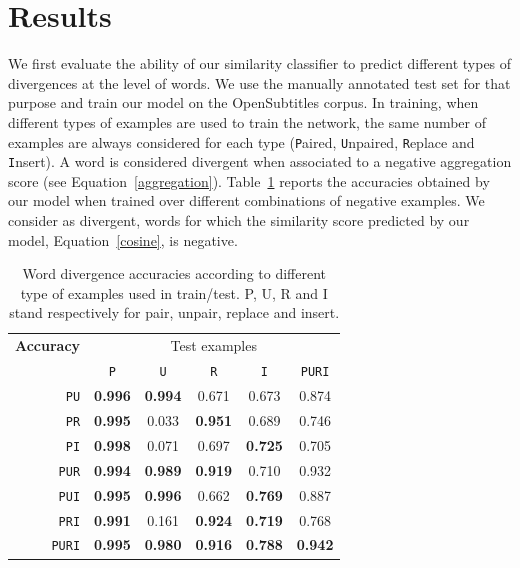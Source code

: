 \documentclass[11pt,a4paper]{article}
\begin{document}
\section{Results}
\label{sec:results}

We first evaluate the ability of our similarity classifier to predict different types of divergences at the level of words. 
We use the manually annotated test set for that purpose and train our model on the OpenSubtitles corpus.
In training, when different types of examples are used to train the network, the same number of examples are always considered for each type ({\texttt P}aired, {\texttt U}npaired, {\texttt R}eplace and {\texttt I}nsert). 
A word is considered divergent when associated to a negative aggregation score (see Equation~\eqref{aggregation}).
Table~\ref{results_puri} reports the accuracies obtained by our model
when trained over different combinations of negative examples.%
We consider as divergent, words for which the similarity score predicted by our model, Equation~\eqref{cosine}, is negative.

\begin{table}[h]
\small
\center
\begin{tabular}{crccccc}
\hline
\multicolumn{2}{l}{\bf Accuracy} & \multicolumn{5}{c}{Test examples} \\
 &  & \texttt{P} & \texttt{U} & \texttt{R} & \texttt{I} & \texttt{PURI} \\
 \hline
\parbox[t]{0mm}{} &  \texttt{PU}     & \bf 0.996 & \bf 0.994 & 0.671 & 0.673 & 0.874 \\
 &  \texttt{PR}     & \bf 0.995 &      0.033 & \bf 0.951 &      0.689 & 0.746 \\
 &  \texttt{PI}       & \bf 0.998 &      0.071 &      0.697 & \bf 0.725 & 0.705 \\
 &  \texttt{PUR}  & \bf 0.994 & \bf 0.989 & \bf 0.919 &      0.710 & 0.932 \\
 &  \texttt{PUI}    & \bf 0.995 & \bf 0.996 &      0.662 & \bf 0.769 & 0.887 \\
 &  \texttt{PRI}    & \bf 0.991 &      0.161 & \bf 0.924 & \bf 0.719 & 0.768 \\
 &  \texttt{PURI} & \bf 0.995 & \bf 0.980 & \bf 0.916 & \bf 0.788 & \bf 0.942 \\
\hline
\end{tabular}
\caption{Word divergence accuracies according to different type of examples used in train/test. P, U, R and I stand respectively for pair, unpair, replace and insert.}
\label{results_puri}
\end{table}
\end{document}
